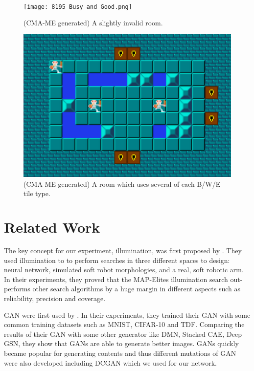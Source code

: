 \documentclass{article}
\begin{document}
\begin{figure}
    \centering
    \texttt{[image: 8195 Busy and Good.png]}
    \caption{(CMA-ME generated) A slightly invalid room.}
    \label{broken}
\end{figure}

\begin{figure}
    \centering
    \includegraphics[width=\linewidth]{CMAME 1 9183 Busy but good.png}
    \caption{(CMA-ME generated) A room which uses several of each B/W/E tile type.}
    \label{b/w/e}
\end{figure}






\section{Related Work}
The key concept for our experiment, illumination, was first proposed by \cite{Mouret2015}. They used illumination to to perform searches in three different spaces to design: neural network, simulated soft robot morphologies, and a real, soft robotic arm. In their experiments, they proved that the MAP-Elites illumination search out-performs other search algorithms by a huge margin in different aspects such as reliability, precision and coverage.

GAN were first used by \cite{Goodfellow2014}. In their experiments, they trained their GAN with some common training datasets such as MNIST, CIFAR-10 and TDF. Comparing the results of their GAN with some other generator like DMN, Stacked CAE, Deep GSN, they show that GANs are able to generate better images. GANs quickly became popular for generating contents and thus different mutations of GAN were also developed including DCGAN \cite{radford2016} which we used for our network.  
\end{document}
